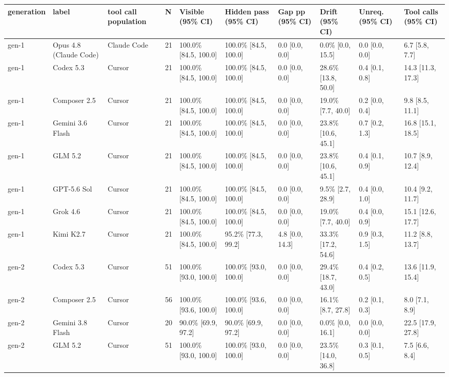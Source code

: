 \begin{tabular}{llllllllll}
\toprule
generation & label & tool call population & N & Visible (95\% CI) & Hidden pass (95\% CI) & Gap pp (95\% CI) & Drift (95\% CI) & Unreq. (95\% CI) & Tool calls (95\% CI) \\
\midrule
gen-1 & Opus 4.8 (Claude Code) & Claude Code & 21 & 100.0\% [84.5, 100.0] & 100.0\% [84.5, 100.0] & 0.0 [0.0, 0.0] & 0.0\% [0.0, 15.5] & 0.0 [0.0, 0.0] & 6.7 [5.8, 7.7] \\
gen-1 & Codex 5.3 & Cursor & 21 & 100.0\% [84.5, 100.0] & 100.0\% [84.5, 100.0] & 0.0 [0.0, 0.0] & 28.6\% [13.8, 50.0] & 0.4 [0.1, 0.8] & 14.3 [11.3, 17.3] \\
gen-1 & Composer 2.5 & Cursor & 21 & 100.0\% [84.5, 100.0] & 100.0\% [84.5, 100.0] & 0.0 [0.0, 0.0] & 19.0\% [7.7, 40.0] & 0.2 [0.0, 0.4] & 9.8 [8.5, 11.1] \\
gen-1 & Gemini 3.6 Flash & Cursor & 21 & 100.0\% [84.5, 100.0] & 100.0\% [84.5, 100.0] & 0.0 [0.0, 0.0] & 23.8\% [10.6, 45.1] & 0.7 [0.2, 1.3] & 16.8 [15.1, 18.5] \\
gen-1 & GLM 5.2 & Cursor & 21 & 100.0\% [84.5, 100.0] & 100.0\% [84.5, 100.0] & 0.0 [0.0, 0.0] & 23.8\% [10.6, 45.1] & 0.4 [0.1, 0.9] & 10.7 [8.9, 12.4] \\
gen-1 & GPT-5.6 Sol & Cursor & 21 & 100.0\% [84.5, 100.0] & 100.0\% [84.5, 100.0] & 0.0 [0.0, 0.0] & 9.5\% [2.7, 28.9] & 0.4 [0.0, 1.0] & 10.4 [9.2, 11.7] \\
gen-1 & Grok 4.6 & Cursor & 21 & 100.0\% [84.5, 100.0] & 100.0\% [84.5, 100.0] & 0.0 [0.0, 0.0] & 19.0\% [7.7, 40.0] & 0.4 [0.0, 0.9] & 15.1 [12.6, 17.7] \\
gen-1 & Kimi K2.7 & Cursor & 21 & 100.0\% [84.5, 100.0] & 95.2\% [77.3, 99.2] & 4.8 [0.0, 14.3] & 33.3\% [17.2, 54.6] & 0.9 [0.3, 1.5] & 11.2 [8.8, 13.7] \\
gen-2 & Codex 5.3 & Cursor & 51 & 100.0\% [93.0, 100.0] & 100.0\% [93.0, 100.0] & 0.0 [0.0, 0.0] & 29.4\% [18.7, 43.0] & 0.4 [0.2, 0.5] & 13.6 [11.9, 15.4] \\
gen-2 & Composer 2.5 & Cursor & 56 & 100.0\% [93.6, 100.0] & 100.0\% [93.6, 100.0] & 0.0 [0.0, 0.0] & 16.1\% [8.7, 27.8] & 0.2 [0.1, 0.3] & 8.0 [7.1, 8.9] \\
gen-2 & Gemini 3.8 Flash & Cursor & 20 & 90.0\% [69.9, 97.2] & 90.0\% [69.9, 97.2] & 0.0 [0.0, 0.0] & 0.0\% [0.0, 16.1] & 0.0 [0.0, 0.0] & 22.5 [17.9, 27.8] \\
gen-2 & GLM 5.2 & Cursor & 51 & 100.0\% [93.0, 100.0] & 100.0\% [93.0, 100.0] & 0.0 [0.0, 0.0] & 23.5\% [14.0, 36.8] & 0.3 [0.1, 0.5] & 7.5 [6.6, 8.4] \\

\end{tabular}
